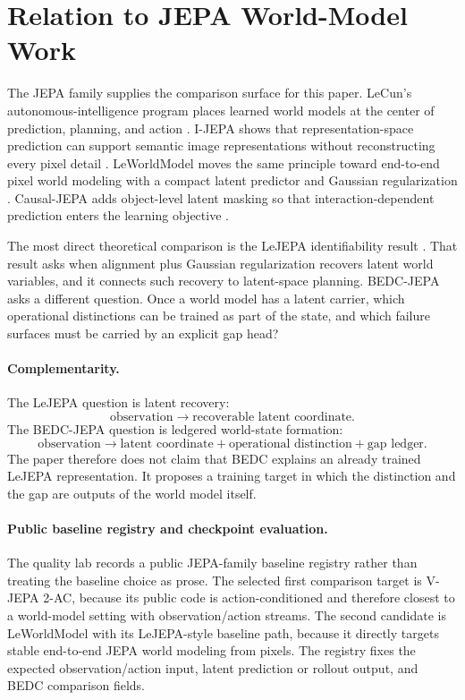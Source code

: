 \section{Relation to JEPA World-Model Work}
\label{sec:relation-to-jepa}

The JEPA family supplies the comparison surface for this paper.  LeCun's
autonomous-intelligence program places learned world models at the center of
prediction, planning, and action \cite{lecun-ami}.  I-JEPA shows that
representation-space prediction can support semantic image representations
without reconstructing every pixel detail \cite{ijepa}.  LeWorldModel moves
the same principle toward end-to-end pixel world modeling with a compact
latent predictor and Gaussian regularization \cite{leworldmodel}.  Causal-JEPA
adds object-level latent masking so that interaction-dependent prediction
enters the learning objective \cite{causal-jepa}.

The most direct theoretical comparison is the LeJEPA identifiability result
\cite{lejepa-world-model}.  That result asks when alignment plus Gaussian
regularization recovers latent world variables, and it connects such recovery
to latent-space planning.  BEDC-JEPA asks a different question.  Once a world
model has a latent carrier, which operational distinctions can be trained as
part of the state, and which failure surfaces must be carried by an explicit
gap head?

\paragraph{Complementarity.}
The LeJEPA question is latent recovery:
$$
\text{observation} \longrightarrow \text{recoverable latent coordinate}.
$$
The BEDC-JEPA question is ledgered world-state formation:
$$
\text{observation}
\longrightarrow
\text{latent coordinate}
+ \text{operational distinction}
+ \text{gap ledger}.
$$
The paper therefore does not claim that BEDC explains an already trained
LeJEPA representation.  It proposes a training target in which the distinction
and the gap are outputs of the world model itself.

\paragraph{Public baseline registry and checkpoint evaluation.}
The quality lab records a public JEPA-family baseline registry rather than
treating the baseline choice as prose.  The selected first comparison target
is V-JEPA 2-AC, because its public code is action-conditioned and therefore
closest to a world-model setting with observation/action streams.  The second
candidate is LeWorldModel with its LeJEPA-style baseline path, because it
directly targets stable end-to-end JEPA world modeling from pixels.  The
registry fixes the expected observation/action input, latent prediction or
rollout output, and BEDC comparison fields.

